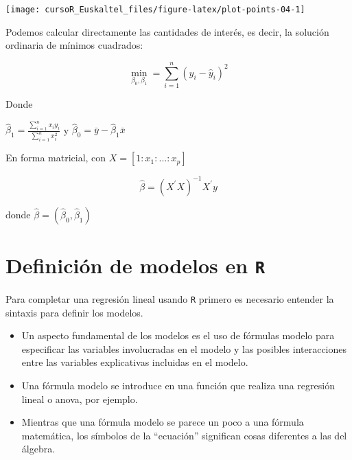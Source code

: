 \documentclass[]{book}
\begin{document}
\begin{center}\texttt{[image: cursoR\_Euskaltel\_files/figure-latex/plot-points-04-1]} \end{center}

Podemos calcular directamente las cantidades de interés, es decir, la
solución ordinaria de mínimos cuadrados:

\[
\min_{\beta_0,\beta_1} = \sum_{i=1}^{n} (y_i - \hat{y}_i)^2  
\]

Donde

\(\hat{\beta}_1 = \frac{\sum_{i=1}^{n}x_iy_i}{\sum_{i=1}^n x_i^2}\) y
\(\hat{\beta}_0 = \bar{y} - \hat{\beta}_1\bar{x}\)

En forma matricial, con \(X=[1:x_1:...:x_p]\)

\[
\hat{\beta}  = (X^\prime X)^{-1} X^\prime y
\]

donde \(\hat{\beta} = (\hat{\beta}_0,\hat{\beta}_1)\)

\section{\texorpdfstring{Definición de modelos en
\texttt{R}}{Definición de modelos en R}}\label{definicion-de-modelos-en-r}

Para completar una regresión lineal usando \texttt{R} primero es
necesario entender la sintaxis para definir los modelos.

\begin{itemize}
\item
  Un aspecto fundamental de los modelos es el uso de fórmulas modelo
  para especificar las variables involucradas en el modelo y las
  posibles interacciones entre las variables explicativas incluidas en
  el modelo.
\item
  Una fórmula modelo se introduce en una función que realiza una
  regresión lineal o anova, por ejemplo.
\item
  Mientras que una fórmula modelo se parece un poco a una fórmula
  matemática, los símbolos de la ``ecuación'' significan cosas
  diferentes a las del álgebra.
\end{itemize}
\end{document}
